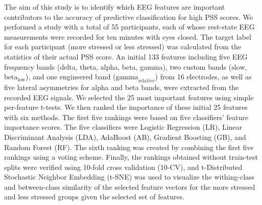 \documentclass[pdflatex,sn-mathphys]{sn-jnl}%
\theoremstyle{thmstyleone}%
\theoremstyle{thmstyletwo}%
\theoremstyle{thmstylethree}%
\begin{document}
The aim of this study is to identify which EEG features are important contributors to the accuracy of predictive classification for high PSS scores. We performed a study with a total of 55 participants, each of whose rest-state EEG measurements were recorded for ten minutes with eyes closed. The target label for each participant (more stressed or less stressed) was calculated from the statistics of their actual PSS score. An initial 133 features including five EEG frequency bands (delta, theta, alpha, beta, gamma), two custom bands ($\text{slow}$, $\text{beta}_{\text{low}}$), and one engineered band ($\text{gamma}_{\text{relative}}$) from 16 electrodes, as well as five lateral asymmetries for alpha and beta bands, were extracted from the recorded EEG signals. We selected the 25 most important features using simple per-feature t-tests. We then ranked the importance of these initial 25 features with six methods. The first five rankings were based on five classifiers' feature importance scores. The five classifiers were Logistic Regression (LR), Linear Discriminant Analysis (LDA), AdaBoost (AB), Gradient Boosting (GB), and Random Forest (RF). The sixth ranking was created by combining the first five rankings using a voting scheme. Finally, the rankings obtained without train-test splits were verified using 10-fold cross validation (10-CV), and t-Distributed Stochastic Neighbor Embedding (t-SNE) was used to visualize the withing-class and between-class similarity of the selected feature vectors for the more stressed and less stressed groups given the selected set of features.

\end{document}
